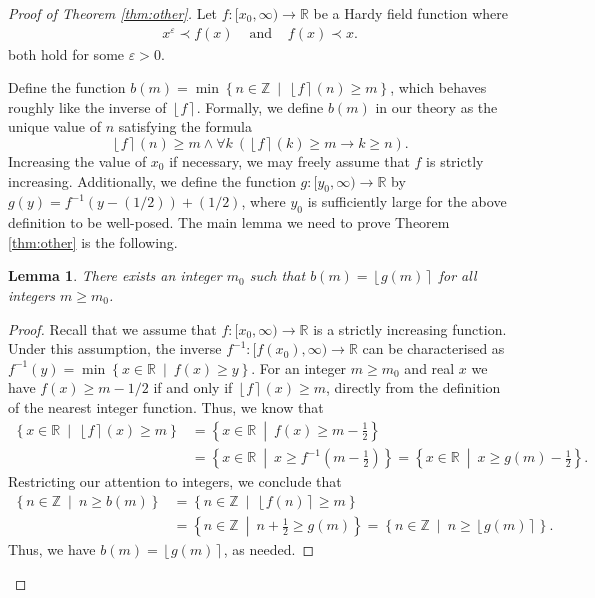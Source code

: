 \documentclass{amsart}
\newtheorem{lemma}[theorem]{Lemma}
\theoremstyle{definition}
\newcommand{\nint}[1]{\left\lfloor #1 \right\rceil}
\newcommand{\bra}[1]{\left( #1 \right)}
\newcommand{\set}[2]{\left\{ #1 \ \middle| \ #2 \right\} }
\newcommand{\e}{\varepsilon}
\newcommand{\ZZ}{\mathbb{Z}}
\newcommand{\RR}{\mathbb{R}}
\newcommand{\inv}[1]{#1^{-1}}
\begin{document}
\begin{proof}[Proof of Theorem \ref{thm:other}] 
Let $f \colon [x_0, \infty) \to \RR$ be a Hardy field function where
\begin{eqnarray*}
\label{eqn:sub-linear-growth}
 x^{\e} \prec f(x) &\text{ and } & f(x) \prec x.
\end{eqnarray*}
both hold for some $\e > 0$.

Define the function $b(m) = \min \set{ n \in \ZZ }{ \nint{f}(n) \geq m}$, which behaves roughly like the inverse of $\nint{f}$. Formally, we define $b(m)$ in our theory as the unique value of $n$ satisfying the formula
\begin{equation*}
\nint{f}(n) \geq m \wedge \forall k\ (\nint{f}(k) \geq m \rightarrow k \geq n).
\end{equation*}
Increasing the value of $x_0$ if necessary, we may freely assume that $f$ is strictly increasing.
Additionally, we define the function $g \colon [y_0, \infty) \to \RR$ by $g(y) = \inv{f}(y - (1/2)) + (1/2)$, where $y_0$ is sufficiently large for the above definition to be well-posed. The main lemma we need to prove Theorem \ref{thm:other} is the following.

\begin{lemma}
\label{lem:agreement-of-inverses}
There exists an integer $m_0$ such that $b(m) = \nint{g(m)}$ for all integers $m \geq m_0$.
\end{lemma}
\begin{proof}
Recall that we assume that $f \colon [x_0, \infty) \to \RR$ is a strictly increasing function. Under this assumption, the inverse $\inv{f} : [f(x_0), \infty) \to \RR$ can be characterised as  $\inv{f}(y) = \min \set{x \in \RR}{f(x) \geq y}$. For an integer $m \geq m_0$ and real $x$ we have $f(x) \geq m-1/2$ if and only if $\nint{f}(x) \geq m$, directly from the definition of the nearest integer function. Thus, we know that
\begin{align*}
 \set{x \in \RR}{\!\nint{f}(x) \geq m} &= \set{x \in \RR}{\!f(x) \geq\!m-\frac{1}{2}} 
 \\ &= \set{\!x \in \RR}{\!x \geq f^{-1}\bra{m-\frac{1}{2}}} = \set{\!x \in \RR}{\!x \geq g(m) - \frac{1}{2}}.
\end{align*} 
Restricting our attention to integers, we conclude that
\begin{align*}
	\set{n \in \ZZ}{ n \geq b(m)} &=
	\set{n \in \ZZ}{ \nint{f(n)} \ge m} 
	\\ & = \set{n \in \ZZ}{n + \frac{1}{2} \geq g(m)} 
	= \set{n \in \ZZ}{n \geq \nint{g(m)}}.	
\end{align*}
 Thus, we have $b(m) = \nint{g(m)}$, as needed.
\end{proof}


\end{proof}
\end{document}
